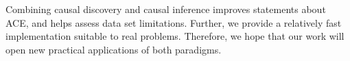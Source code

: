 \documentclass[letterpaper]{article}
\begin{document}
Combining causal discovery and causal inference improves statements about ACE, and helps assess data set limitations.  Further, we provide a relatively fast implementation suitable to real problems.  Therefore, we hope that our work will open new practical applications of both paradigms.
 
\small

\end{document}
